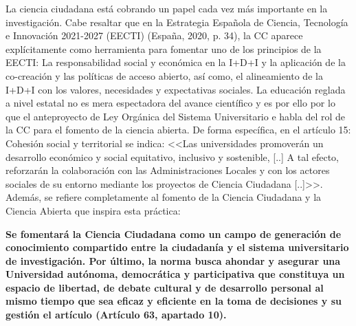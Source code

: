 La ciencia ciudadana está cobrando un papel cada vez más importante en la investigación. Cabe resaltar que en la Estrategia Española de Ciencia, Tecnología e Innovación 2021-2027 (EECTI) (España, 2020, p. 34), la CC aparece explícitamente como herramienta para fomentar uno de los principios de la EECTI: La responsabilidad social y económica en la I+D+I y la aplicación de la co-creación y las políticas de acceso abierto, así como, el alineamiento de la I+D+I con los valores, necesidades y expectativas sociales. La educación reglada a nivel estatal no es mera espectadora del avance científico y es por ello por lo que el anteproyecto de Ley Orgánica del Sistema Universitario e habla del rol de la CC para el fomento de la ciencia abierta. De forma específica, en el artículo 15: Cohesión social y territorial se indica: <<Las universidades promoverán un desarrollo económico y social equitativo, inclusivo y sostenible, [..] A tal efecto, reforzarán la colaboración con las Administraciones Locales y con los actores sociales de su entorno mediante los proyectos de Ciencia Ciudadana [..]>>. Además, se refiere completamente al fomento de la Ciencia Ciudadana y la Ciencia Abierta que inspira esta práctica:

\textbf{Se fomentará la Ciencia Ciudadana como un campo de generación de conocimiento compartido entre la ciudadanía y el sistema universitario de investigación. Por último, la norma busca ahondar y asegurar una Universidad autónoma, democrática y participativa que constituya un espacio de libertad, de debate cultural y de desarrollo personal al mismo tiempo que sea eficaz y eficiente en la toma de decisiones y su gestión el artículo (Artículo 63, apartado 10).}

